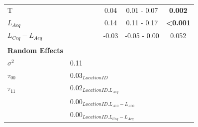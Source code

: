 \begin{table}[ht]
\begin{tabular}{@{}l|lccccc@{}}
    T                                        & \multicolumn{1}{c}{}                                    &               &                           & 0.04  & 0.01 - 0.07   & \textbf{0.002}            \\
    $L_{Aeq}$                                & \multicolumn{1}{c}{}                                    &               &                           & 0.14  & 0.11 - 0.17   & \textbf{\textless{}0.001} \\
    $L_{Ceq}-L_{Aeq}$                        & \multicolumn{1}{c}{}                                    &               &                           & -0.03 & -0.05 - 0.00  & 0.052                     \\
    \\
    \textbf{Random Effects}                  &
                                             &
    \multicolumn{1}{l}{}                     &
    \multicolumn{1}{l}{}                     &
    \multicolumn{1}{l}{}                     &
    \multicolumn{1}{l}{}                     &
    \multicolumn{1}{l}{}                                                                                                                                                                               \\
    $\sigma^2$                               &
    0.11                                     &
    \multicolumn{1}{l}{}                     &
    \multicolumn{1}{l}{}                     &
    \multicolumn{1}{l}{}                     &
    \multicolumn{1}{l}{}                     &
    \multicolumn{1}{l}{}                                                                                                                                                                               \\
    $\tau_{00}$                              & \multicolumn{6}{l}{$0.03_{LocationID}$}                                                                                                                 \\
    $\tau_{11}$                              & \multicolumn{6}{l}{$0.02_{LocationID.L_{Aeq}}$}                                                                                                         \\
                                             & \multicolumn{6}{l}{$0.00_{LocationID.L_{A10}-L_{A90}}$}                                                                                                 \\
                                             & \multicolumn{6}{l}{$0.00_{LocationID.L_{Ceq}-L_{Aeq}}$}                                                                                                 \\

\end{tabular}
\end{table}
